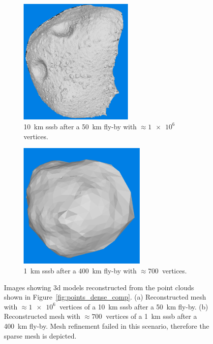 \begin{figure}[htb]
    \centering
        \begin{subfigure}[b]{0.42\textwidth}
            \centering
            \includegraphics[width=\textwidth,height=6.2cm]{doc/thesis/0_figures/models_quality/50_10/120_50_10_refine2.png}
            \caption{\SI{10}{\kilo\meter} \gls{sssb} after a \SI{50}{\kilo\meter} fly-by with $\approx\SI{1e6}{}$ vertices.} %
            \label{fig:models_50_10}
        \end{subfigure}
        \begin{subfigure}[b]{0.42\textwidth}
            \centering
            \includegraphics[width=\textwidth,height=6.2cm]{doc/thesis/0_figures/models_quality/400_1/120_400_1_mesh2.png}
            \caption{\SI{1}{\kilo\meter} \gls{sssb} after a \SI{400}{\kilo\meter} fly-by with $\approx\SI{700}{}$ vertices.}
            \label{fig:models_400_1}
        \end{subfigure}
    \caption{Images showing \gls{3d} models reconstructed from the point clouds shown in Figure~\ref{fig:points_dense_comp}. (a) Reconstructed mesh with $\approx\SI{1e6}{}$ vertices of a \SI{10}{\kilo\meter} \gls{sssb} after a \SI{50}{\kilo\meter} fly-by. (b) Reconstructed mesh with $\approx\SI{700}{}$ vertices of a \SI{1}{\kilo\meter} \gls{sssb} after a \SI{400}{\kilo\meter} fly-by. Mesh refinement failed in this scenario, therefore the sparse mesh is depicted.}
    \label{fig:models_comp}
\end{figure}

